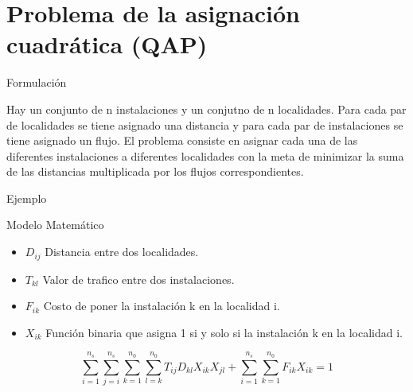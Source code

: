\documentclass[10pt]{beamer}
\begin{document}
\section{Problema de la asignación cuadrática (QAP)}

\begin{frame}{Formulación}

	Hay un conjunto de n instalaciones y un conjutno de n localidades. Para cada
	par de localidades se tiene asignado una distancia y para cada par de instalaciones
	se tiene asignado un flujo. El problema consiste en asignar cada una de las 
	diferentes instalaciones a diferentes localidades con la meta de minimizar
	la suma de las distancias multiplicada por los flujos correspondientes.

\end{frame}

\begin{frame}{Ejemplo}


\end{frame}

\begin{frame}{Modelo Matemático}
	
	\begin{itemize}
	
		\item $D_{ij}$ Distancia entre dos localidades.
		
		\item $T_{kl}$ Valor de trafico entre dos instalaciones.
		
		\item $F_{ik}$ Costo de poner la instalación k en la localidad i.
		
		\item $X_{ik}$ Función binaria que asigna 1 si y solo si la
		instalación k en la localidad i.
	
	\end{itemize}
	
	$$\sum_{i=1}^{n_{s}} \sum_{j=i}^{n_{s}} \sum_{k=1}^{n_{0}} \sum_{l=k}^{n_{0}} T_{ij}D_{kl}X_{ik}X_{jl} +
	\sum_{i=1}^{n_{s}} \sum_{k=1}^{n_{0}} F_{ik}X_{ik}= 1$$
	
\end{frame}
\end{document}
